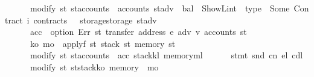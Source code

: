 \begin{isabellebody}
\ \ \ \ \ \ modify\ {\isacharparenleft}{\kern0pt}{\isasymlambda}st{\isachardot}{\kern0pt}\ st{\isasymlparr}accounts\ {\isacharcolon}{\kern0pt}{\isacharequal}{\kern0pt}\ {\isacharparenleft}{\kern0pt}accounts\ st{\isacharparenright}{\kern0pt}{\isacharparenleft}{\kern0pt}adv\ {\isacharcolon}{\kern0pt}{\isacharequal}{\kern0pt}\ {\isasymlparr}bal\ {\isacharequal}{\kern0pt}\ ShowL\isactrlsub i\isactrlsub n\isactrlsub t\ {}{\isacharcomma}{\kern0pt}\ type\ {\isacharequal}{\kern0pt}\ Some\ {\isacharparenleft}{\kern0pt}Contract\ i{\isacharparenright}{\kern0pt}{\isacharcomma}{\kern0pt}\ contracts\ {\isacharequal}{\kern0pt}\ {}{\isasymrparr}{\isacharparenright}{\kern0pt}{\isacharcomma}{\kern0pt}\ storage{\isacharcolon}{\kern0pt}{\isacharequal}{\kern0pt}{\isacharparenleft}{\kern0pt}storage\ st{\isacharparenright}{\kern0pt}{\isacharparenleft}{\kern0pt}adv\ {\isacharcolon}{\kern0pt}{\isacharequal}{\kern0pt}\ {\isacharbraceleft}{\kern0pt}{\isachardollar}{\kern0pt}{\isachardollar}{\kern0pt}{\isacharbraceright}{\kern0pt}{\isacharparenright}{\kern0pt}{\isasymrparr}{\isacharparenright}{\kern0pt}{\isacharsemicolon}{\kern0pt}\isanewline
\ \ \ \ \ \ acc\ {\isasymleftarrow}\ option\ Err\ {\isacharparenleft}{\kern0pt}{\isasymlambda}st{\isachardot}{\kern0pt}\ transfer\ {\isacharparenleft}{\kern0pt}address\ e{\isacharparenright}{\kern0pt}\ adv\ v\ {\isacharparenleft}{\kern0pt}accounts\ st{\isacharparenright}{\kern0pt}{\isacharparenright}{\kern0pt}{\isacharsemicolon}{\kern0pt}\isanewline
\ \ \ \ \ \ {\isacharparenleft}{\kern0pt}k\isactrlsub o{\isacharcomma}{\kern0pt}\ m\isactrlsub o{\isacharparenright}{\kern0pt}\ {\isasymleftarrow}\ applyf\ {\isacharparenleft}{\kern0pt}{\isasymlambda}st{\isachardot}{\kern0pt}\ {\isacharparenleft}{\kern0pt}stack\ st{\isacharcomma}{\kern0pt}\ memory\ st{\isacharparenright}{\kern0pt}{\isacharparenright}{\kern0pt}{\isacharsemicolon}{\kern0pt}\isanewline
\ \ \ \ \ \ modify\ {\isacharparenleft}{\kern0pt}{\isasymlambda}st{\isachardot}{\kern0pt}\ st{\isasymlparr}accounts\ {\isacharcolon}{\kern0pt}{\isacharequal}{\kern0pt}\ acc{\isacharcomma}{\kern0pt}\ stack{\isacharcolon}{\kern0pt}{\isacharequal}{\kern0pt}k\isactrlsub l{\isacharcomma}{\kern0pt}\ memory{\isacharcolon}{\kern0pt}{\isacharequal}{\kern0pt}m\isactrlsub l{\isasymrparr}{\isacharparenright}{\kern0pt}{\isacharsemicolon}{\kern0pt}\isanewline
\ \ \ \ \ \ stmt\ {\isacharparenleft}{\kern0pt}snd\ cn{\isacharparenright}{\kern0pt}\ e\isactrlsub l\ cd\isactrlsub l{\isacharsemicolon}{\kern0pt}\isanewline
\ \ \ \ \ \ modify\ {\isacharparenleft}{\kern0pt}{\isasymlambda}st{\isachardot}{\kern0pt}\ st{\isasymlparr}stack{\isacharcolon}{\kern0pt}{\isacharequal}{\kern0pt}k\isactrlsub o{\isacharcomma}{\kern0pt}\ memory\ {\isacharcolon}{\kern0pt}{\isacharequal}{\kern0pt}\ m\isactrlsub o{\isasymrparr}{\isacharparenright}{\kern0pt}{\isacharsemicolon}{\kern0pt}\isanewline

\end{isabellebody}
